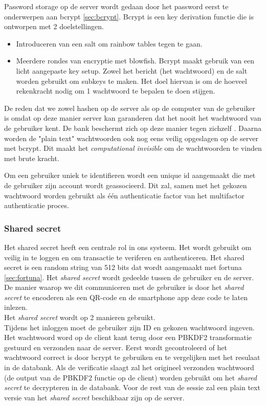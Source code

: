 \documentclass[11pt]{article}
\begin{document}
Password storage op de server wordt gedaan door het password eerst te onderwerpen aan bcrypt \ref{sec:bcrypt}. Bcrypt is een key derivation functie die is ontworpen met 2 doelstellingen.
\begin{itemize}
\item Introduceren van een salt om rainbow tables tegen te gaan.
\item Meerdere rondes van encryptie met blowfish. Bcrypt maakt gebruik van een licht aangepaste key setup. Zowel het bericht (het wachtwoord) en de salt worden gebruikt om subkeys te maken. Het doel hiervan is om de hoeveel rekenkracht nodig om 1 wachtwoord te bepalen te doen stijgen. 
\end{itemize}
De reden dat we zowel hashen op de server als op de computer van de gebruiker is omdat op deze manier server kan garanderen dat het nooit het wachtwoord van de gebruiker kent. De bank beschermt zich op deze manier tegen zichzelf \cite{pw_habit}. Daarna worden de "plain text" wachtwoorden ook nog eens veilig opgeslagen op de server met bcrypt\cite{bcrypt}. Dit maakt het \emph{computational invisible} om de wachtwoorden te vinden met brute kracht.

Om een gebruiker uniek te identifieren wordt een unique id aangemaakt die met de gebruiker zijn account wordt geassocieerd. Dit zal, samen met het gekozen wachtwoord worden gebruikt als één authenticatie factor van het multifactor authenticatie proces.
	
\subsubsection{Shared secret}
Het shared secret heeft een centrale rol in ons systeem. Het wordt gebruikt om veilig in te loggen en om transactie te veriferen en authenticeren. Het shared secret is een random string van 512 bits dat wordt aangemaakt met fortuna \ref{sec:fortuna}. 
Het \emph{shared secret} wordt gedeelde tussen de gebruiker en de server. De manier waarop we dit communiceren met de gebruiker is door het \emph{shared secret} te encoderen als een QR-code en de smartphone app deze code te laten inlezen.\\
Het \emph{shared secret} wordt op 2 manieren gebruikt. \\
Tijdens het inloggen moet de gebruiker zijn ID en gekozen wachtwoord ingeven. Het wachtwoord word op de client kant terug door een PBKDF2 transformatie gestuurd en verzonden naar de server. Eerst wordt gecontroleerd of het wachtwoord correct is door bcrypt te gebruiken en te vergelijken met het resulaat in de databank. Als de verificatie slaagt zal het origineel verzonden wachtwoord (de output van de PBKDF2 functie op de client) worden gebruikt om het \emph{shared secret} te decrypteren in de databank. Voor de rest van de sessie zal een  plain text versie van het \emph{shared secret} beschikbaar zijn op de server.
\end{document}
